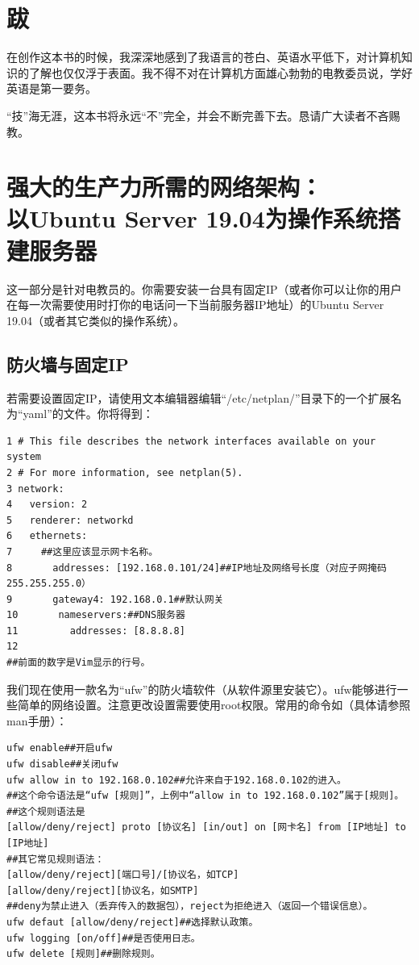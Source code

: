 \chapter{跋}
在创作这本书的时候，我深深地感到了我语言的苍白、英语水平低下，对计算机知识的了解也仅仅浮于表面。我不得不对在计算机方面雄心勃勃的电教委员说，学好英语是第一要务。\par
“技”海无涯，这本书将永远“不”完全，并会不断完善下去。恳请广大读者不吝赐教。
\chapter{强大的生产力所需的网络架构：\\以Ubuntu Server 19.04为操作系统搭建服务器}
这一部分是针对电教员的。你需要安装一台具有固定IP（或者你可以让你的用户在每一次需要使用时打你的电话问一下当前服务器IP地址）的Ubuntu Server 19.04（或者其它类似的操作系统）。
\section{防火墙与固定IP}
若需要设置固定IP，请使用文本编辑器编辑“/etc/netplan/”目录下的一个扩展名为“yaml”的文件。你将得到：
\begin{verbatim}
1 # This file describes the network interfaces available on your system
2 # For more information, see netplan(5).
3 network:
4   version: 2
5   renderer: networkd
6   ethernets:
7     ##这里应该显示网卡名称。
8       addresses: [192.168.0.101/24]##IP地址及网络号长度（对应子网掩码255.255.255.0）
9       gateway4: 192.168.0.1##默认网关
10       nameservers:##DNS服务器
11         addresses: [8.8.8.8]
12
##前面的数字是Vim显示的行号。
\end{verbatim}\par
我们现在使用一款名为“ufw”的防火墙软件（从软件源里安装它）。ufw能够进行一些简单的网络设置。注意更改设置需要使用root权限。常用的命令如（具体请参照man手册）：
\begin{verbatim}
ufw enable##开启ufw
ufw disable##关闭ufw
ufw allow in to 192.168.0.102##允许来自于192.168.0.102的进入。
##这个命令语法是“ufw [规则]”，上例中“allow in to 192.168.0.102”属于[规则]。
##这个规则语法是
[allow/deny/reject] proto [协议名] [in/out] on [网卡名] from [IP地址] to [IP地址]
##其它常见规则语法：
[allow/deny/reject][端口号]/[协议名，如TCP]
[allow/deny/reject][协议名，如SMTP]
##deny为禁止进入（丢弃传入的数据包），reject为拒绝进入（返回一个错误信息）。
ufw defaut [allow/deny/reject]##选择默认政策。
ufw logging [on/off]##是否使用日志。
ufw delete [规则]##删除规则。
\end{verbatim}
